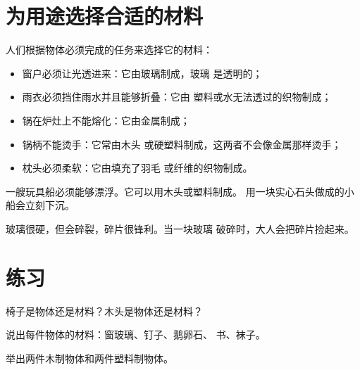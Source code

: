 \section{为用途选择合适的材料}

\begin{proposition}[每种材料都根据其性质来选择]\label{prop:g1:materials-around-us:choose}
人们根据物体必须完成的任务来选择它的材料：
\begin{itemize}
  \item 窗户必须让光透进来：它由玻璃制成，玻璃
        是透明的；
  \item 雨衣必须挡住雨水并且能够折叠：它由
        塑料或水无法透过的织物制成；
  \item 锅在炉灶上不能熔化：它由金属制成；
  \item 锅柄不能烫手：它常由木头
        或硬塑料制成，这两者不会像金属那样烫手；
  \item 枕头必须柔软：它由填充了羽毛
        或纤维的织物制成。
\end{itemize}
\end{proposition}

\begin{example}[小船]\label{ex:g1:materials-around-us:boat}
一艘玩具船必须能够漂浮。它可以用木头或塑料制成。
用一块实心石头做成的小船会立刻下沉。
\end{example}

\begin{remark}[打碎的玻璃]\label{rem:g1:materials-around-us:glass}
玻璃很硬，但会碎裂，碎片很锋利。当一块玻璃
破碎时，大人会把碎片捡起来。
\end{remark}

\section{练习}

\begin{exercise}[$\star$]\label{exo:g1:materials-around-us:1}
椅子是物体还是材料？木头是物体还是材料？
\end{exercise}

\begin{exercise}[$\star$]\label{exo:g1:materials-around-us:2}
说出每件物体的材料：窗玻璃、钉子、鹅卵石、
书、袜子。
\end{exercise}

\begin{exercise}[$\star$]\label{exo:g1:materials-around-us:3}
举出两件木制物体和两件塑料制物体。
\end{exercise}

